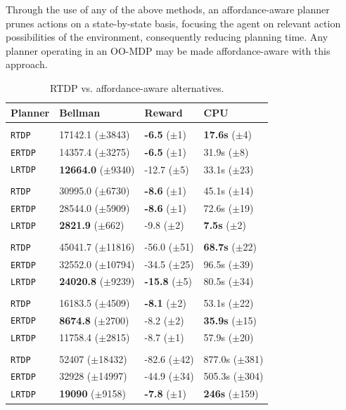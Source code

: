 \documentclass[letterpaper]{article}
\newcommand{\ra}[1]{\renewcommand{\arraystretch}{#1}} %
\begin{document}
Through the use of any of the above methods, an affordance-aware
planner prunes actions on a state-by-state basis, focusing the agent
on relevant action possibilities of the environment, consequently
reducing planning time. Any planner operating in an OO-MDP may be made
affordance-aware with this approach.

\begin{table}[t]
\ra{1.2}
\small
\begin{tabular}{@{}llll@{}}\toprule
Planner & Bellman & Reward & CPU \\ \midrule
&\hspace{-10mm}{\it Mining Task} \\
\texttt{RTDP} & 17142.1 ($\pm$3843) 		& {\bf -6.5} ($\pm$1)  & {\bf 17.6s}   ($\pm$4) \\
\texttt{ERTDP} 	& 14357.4 ($\pm$3275) 		& {\bf -6.5}   ($\pm$1) & 31.9s   ($\pm$8) \\
\texttt{LRTDP} 	& {\bf 12664.0} ($\pm$9340) 	& -12.7 ($\pm$5) & 33.1s   ($\pm$23) \\\hline
&\hspace{-10mm}{\it Smelting Task} \\
\texttt{RTDP} 	& 30995.0 ($\pm$6730) 		& {\bf -8.6}   ($\pm$1) & 45.1s   ($\pm$14) \\
\texttt{ERTDP} 	& 28544.0 ($\pm$5909) 		& {\bf -8.6}   ($\pm$1) & 72.6s   ($\pm$19) \\ 
\texttt{LRTDP} 	& {\bf 2821.9} 	 ($\pm$662) 	& -9.8   ($\pm$2) & {\bf 7.5s}  ($\pm$2) \\ \hline
&\hspace{-10mm}{\it Wall Traversal Task} \\
\texttt{RTDP} & 45041.7 ($\pm$11816) 		& -56.0   ($\pm$51) & {\bf 68.7s}   ($\pm$22) \\
\texttt{ERTDP} 	& 32552.0 ($\pm$10794) 		& -34.5   ($\pm$25) & 96.5s   ($\pm$39) \\ 
\texttt{LRTDP} 	& {\bf 24020.8} ($\pm$9239) 	& {\bf -15.8}   ($\pm$5) & 80.5s   ($\pm$34) \\ \hline
&\hspace{-10mm}{\it Trench Traversal Task} \\
\texttt{RTDP}  	& 16183.5 ($\pm$4509) 		& {\bf -8.1}   ($\pm$2) & 53.1s   ($\pm$22) \\
\texttt{ERTDP} 	& {\bf 8674.8} 	($\pm$2700) 	& -8.2   ($\pm$2) & {\bf 35.9s}   ($\pm$15) \\ 
\texttt{LRTDP} 	& 11758.4 ($\pm$2815) 		& -8.7   ($\pm$1) & 57.9s   ($\pm$20) \\ \hline
&\hspace{-10mm}{\it Plane Traversal Task} \\
\texttt{RTDP} & 52407 ($\pm$18432) 		& -82.6   ($\pm$42) & 877.0s   ($\pm$381) \\
\texttt{ERTDP} 	& 32928 ($\pm$14997) 		& -44.9   ($\pm$34) & 505.3s   ($\pm$304) \\
\texttt{LRTDP} 	& {\bf 19090} 	 ($\pm$9158) 	& {\bf-7.8}   ($\pm$1) & {\bf 246s}  ($\pm$159) \\
\bottomrule
\end{tabular}
\caption{RTDP vs. affordance-aware alternatives.}
\label{table:minecraft_results}
\end{table}
\end{document}
